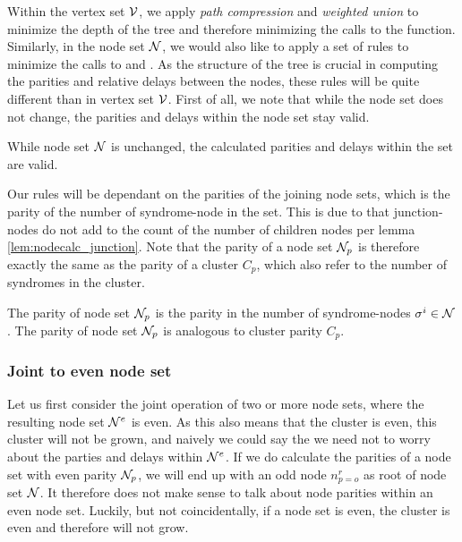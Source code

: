 Within the vertex set $\mathcal{V}$, we apply \emph{path compression} and \emph{weighted union} to minimize the depth of the tree and therefore minimizing the calls to the  function. Similarly, in the node set $\mathcal{N}$, we would also like to apply a set of rules to minimize the calls to  and . As the structure of the tree is crucial in computing the parities and relative delays between the nodes, these rules will be quite different than in vertex set $\mathcal{V}$. First of all, we note that while the node set does not change, the parities and delays within the node set stay valid.

\begin{lemma}\label{lem:nodesetunchanged}
  While node set $\mathcal{N}$ is unchanged, the calculated parities and delays within the set are valid.
\end{lemma}

Our rules will be dependant on the parities of the joining node sets, which is the parity of the number of syndrome-node in the set. This is due to that junction-nodes do not add to the count of the number of children nodes per lemma \ref{lem:nodecalc_junction}. Note that the parity of a node set $\mathcal{N}_p$ is therefore exactly the same as the parity of a cluster $C_p$, which also refer to the number of syndromes in the cluster.

\begin{lemma}
  The parity of node set $\mathcal{N}_p$ is the parity in the number of syndrome-nodes $\sigma^i \in \mathcal{N}$. The parity of node set $\mathcal{N}_p$ is analogous to cluster parity $C_p$.
\end{lemma}

\subsubsection{Joint to even node set}

Let us first consider the joint operation of two or more node sets, where the resulting node set $\mathcal{N}^{e}$ is even. As this also means that the cluster is even, this cluster will not be grown, and naively we could say the we need not to worry about the parties and delays within $\mathcal{N}^{e}$. If we do calculate the parities of a node set with even parity $\mathcal{N}_p$, we will end up with an odd node $n^r_{p=o}$ as root of node set $\mathcal{N}$. It therefore does not make sense to talk about node parities within an even node set. Luckily, but not coincidentally, if a node set is even, the cluster is even and therefore will not grow.

